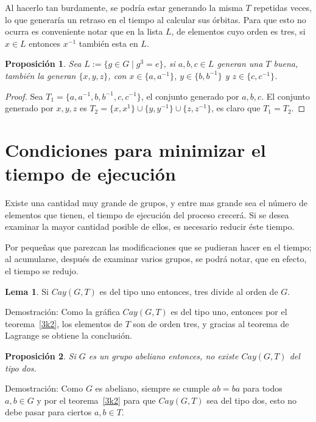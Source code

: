 \documentclass[11pt]{book}
\newtheorem{proposition}{Proposición}
\theoremstyle{definition}
\newtheorem{lemma}{Lema} \newcounter{in} \newcounter{ini}
\begin{document}
Al hacerlo tan burdamente, se podría estar generando la misma $T$
repetidas veces, lo que generaría un retraso en el tiempo al calcular
sus órbitas. Para que esto no ocurra es conveniente notar que en la
lista $L$, de elementos cuyo orden es tres, si $x\in L$ entonces
$x^{-1}$ también esta en $L$.

\begin{proposition}\label{generanaT}
  Sea $L:=\{ g\in G \mid g^3=e\}$, si $a,b,c\in L$ generan una $T$
  buena, también la generan $\{x,y,z\}$, con $x\in \{a,a^{-1}\}$,
  $y\in \{b,b^{-1}\}$ y $z\in \{c,c^{-1}\}$.
\end{proposition}

\begin{proof} Sea $T_1=\{a,a^{-1},b,b^{-1},c,c^{-1}\}$, el conjunto
generado por $a,b,c$. El conjunto generado por $x,y,z$ es
$T_2=\{x,x^1\}\cup \{y,y^{-1}\}\cup \{z,z^{-1}\}$, es claro que
$T_1=T_2$.
\end{proof}
\section[Minimizar el tiempo de ejecución]%
{Condiciones para minimizar el tiempo de ejecución}

Existe una cantidad muy grande de grupos, y entre mas grande sea el
número de elementos que tienen, el tiempo de ejecución del proceso
crecerá. Si se desea examinar la mayor cantidad posible de ellos, es
necesario reducir éste tiempo.

Por pequeñas que parezcan las modificaciones que se pudieran hacer en
el tiempo; al acumularse, después de examinar varios grupos, se podrá
notar, que en efecto, el tiempo se redujo.

\begin{lemma}\label{3entreg}
  Si $Cay(G,T)$ es del tipo uno entonces, tres divide al orden de $G$.
\end{lemma}
Demostración: Como la gráfica $Cay(G,T)$ es del tipo uno, entonces por
el teorema~\ref{3k2}, los elementos de $T$ son de orden tres, y
gracias al teorema de Lagrange se obtiene la conclusión.

\begin{proposition}
  Si $G$ es un grupo abeliano entonces, no existe $Cay(G,T)$ del tipo
  dos.\label{notipo2}
\end{proposition}

Demostración: Como $G$ es abeliano, siempre se cumple $ab=ba$ para
todos $a,b\in G$ y por el teorema~\ref{3k2} para que $Cay(G,T)$ sea
del tipo dos, esto no debe pasar para ciertos $a,b \in T$.
\end{document}
